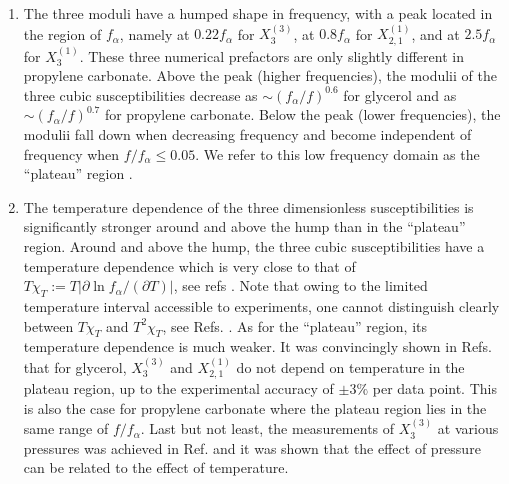 \documentclass[single column,pre]{revtex4}
\begin{document}
\begin{enumerate}
\item 
 The three moduli have a humped shape in frequency, with a peak located in the region of $f_{\alpha}$, namely at $0.22 f_{\alpha}$ for $X_3^{(3)}$, at $0.8 f_{\alpha}$ 
for $X_{2,1}^{(1)}$, and at $2.5 f_{\alpha}$ for $X_3^{(1)}$. These three numerical prefactors are only slightly different in propylene carbonate. Above the peak (higher frequencies), the modulii of the three cubic susceptibilities decrease as $\sim (f_{\alpha}/f)^{0.6}$ for glycerol and as $\sim (f_{\alpha}/f)^{0.7}$ for propylene carbonate. Below the 
peak (lower frequencies), the modulii fall down when decreasing frequency and become independent of frequency when $f/f_{\alpha} \le 0.05$. We refer to this low frequency domain as the ``plateau'' region \cite{note1}.

\item  The temperature dependence of the three dimensionless susceptibilities is significantly stronger around and above the hump than in the ``plateau'' region. Around and above the hump, the three cubic susceptibilities have a temperature dependence which is very close to that of $T \chi_T := T \vert \partial \ln{f_{\alpha}}/(\partial T)\vert$, see refs \cite{Cra10,Bru11,Bau13,Lho14,Cas15}.  Note that owing to the limited temperature interval accessible to experiments, one cannot distinguish clearly between $T \chi_T$ and $T^2 \chi_T$, see Refs. \cite{Bau13,Mic16,note6}. As for the ``plateau'' region, its temperature dependence is much weaker. It was convincingly shown in Refs. \cite{Cra10,Bru11,Lho14} that for glycerol, $X_{3}^{(3)}$ and $X_{2,1}^{(1)}$ do not depend on temperature in the plateau region, up to the experimental accuracy of $\pm 3\%$ per data point. This is also the case for propylene carbonate \cite{Bau13} where the plateau region lies in the same range of $f/f_{\alpha}$. Last but not least, the measurements of $X_3^{(3)}$ at various pressures was achieved in Ref. \cite{Cas15} and it was shown that the effect of pressure can be related to the effect of temperature. 
 

\end{enumerate}
\end{document}
